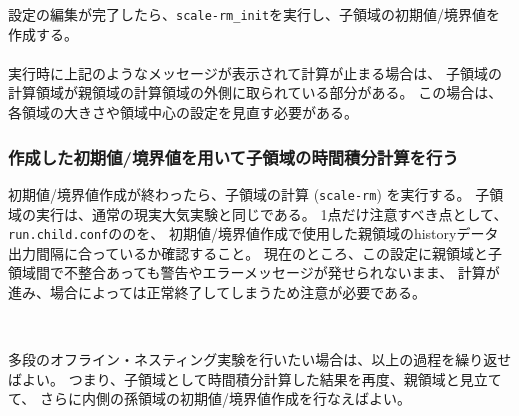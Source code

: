 設定の編集が完了したら、\verb|scale-rm_init|を実行し、子領域の初期値/境界値を作成する。\\

\\

\noindent 実行時に上記のようなメッセージが表示されて計算が止まる場合は、
子領域の計算領域が親領域の計算領域の外側に取られている部分がある。
この場合は、各領域の大きさや領域中心の設定を見直す必要がある。


\subsubsection{作成した初期値/境界値を用いて子領域の時間積分計算を行う}
初期値/境界値作成が終わったら、子領域の計算 (\verb|scale-rm|) を実行する。
子領域の実行は、通常の現実大気実験と同じである。
1点だけ注意すべき点として、
\verb|run.child.conf|ののを、
初期値/境界値作成で使用した親領域のhistoryデータ出力間隔に合っているか確認すること。
現在のところ、この設定に親領域と子領域間で不整合あっても警告やエラーメッセージが発せられないまま、
計算が進み、場合によっては正常終了してしまうため注意が必要である。


\\

\noindent 

多段のオフライン・ネスティング実験を行いたい場合は、以上の過程を繰り返せばよい。
つまり、子領域として時間積分計算した結果を再度、親領域と見立てて、
さらに内側の孫領域の初期値/境界値作成を行なえばよい。


